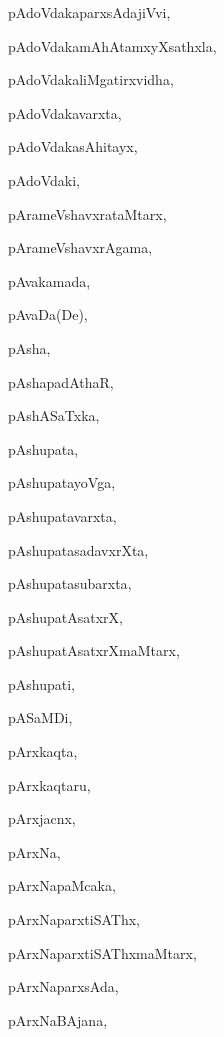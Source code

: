 \begin{multicols}{2}
{pAdoVdakaparxsAdajiVvi}, \pageref{pAdoVdakaparxsAdajiVvi}

{pAdoVdakamAhAtamxyXsathxla}, \pageref{pAdoVdakamAhAtamxyXsathxla}

{pAdoVdakaliMgatirxvidha}, \pageref{pAdoVdakaliMgatirxvidha}

{pAdoVdakavarxta}, \pageref{pAdoVdakavarxta}

{pAdoVdakasAhitayx}, \pageref{pAdoVdakasAhitayx}

{pAdoVdaki}, \pageref{pAdoVdaki}

{pArameVshavxrataMtarx}, \pageref{pArameVshavxrataMtarx}

{pArameVshavxrAgama}, \pageref{pArameVshavxrAgama}

{pAvakamada}, \pageref{pAvakamada}

{pAvaDa(De)}, \pageref{pAvaDaDe}

{pAsha}, \pageref{pAsha}

{pAshapadAthaR}, \pageref{pAshapadAthaR}

{pAshASaTxka}, \pageref{pAshASaTxka}

{pAshupata}, \pageref{pAshupata}

{pAshupatayoVga}, \pageref{pAshupatayoVga}

{pAshupatavarxta}, \pageref{pAshupatavarxta}

{pAshupatasadavxrXta}, \pageref{pAshupatasadavxrXta}

{pAshupatasubarxta}, \pageref{pAshupatasubarxta}

{pAshupatAsatxrX}, \pageref{pAshupatAsatxrX}

{pAshupatAsatxrXmaMtarx}, \pageref{pAshupatAsatxrXmaMtarx}

{pAshupati}, \pageref{pAshupati}

{pASaMDi}, \pageref{pASaMDi}

{pArxkaqta}, \pageref{pArxkaqta}

{pArxkaqtaru}, \pageref{pArxkaqtaru}

{pArxjacnx}, \pageref{pArxjacnx}

{pArxNa}, \pageref{pArxNa}

{pArxNapaMcaka}, \pageref{pArxNapaMcaka}

{pArxNaparxtiSAThx}, \pageref{pArxNaparxtiSAThx}

{pArxNaparxtiSAThxmaMtarx}, \pageref{pArxNaparxtiSAThxmaMtarx}

{pArxNaparxsAda}, \pageref{pArxNaparxsAda}

{pArxNaBAjana}, \pageref{pArxNaBAjana}


\end{multicols}
